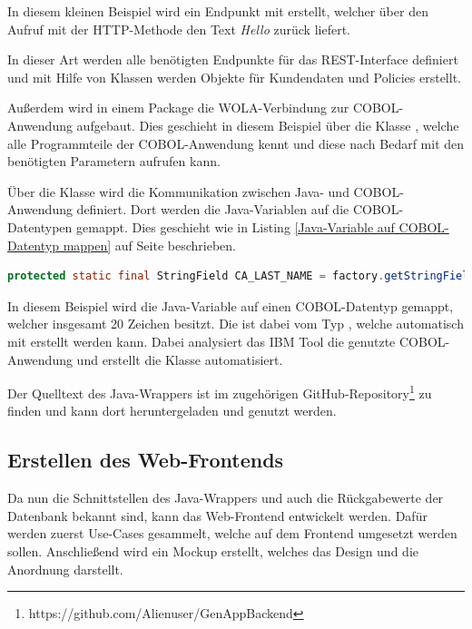In diesem kleinen Beispiel wird ein Endpunkt mit  erstellt, welcher über den Aufruf mit der HTTP-Methode
 den Text \textit{Hello} zurück liefert.

In dieser Art werden alle benötigten Endpunkte für das REST-Interface definiert und mit Hilfe von Klassen werden
Objekte für Kundendaten und Policies erstellt.

Außerdem wird in einem Package die WOLA-Verbindung zur COBOL-Anwendung aufgebaut. Dies geschieht in diesem Beispiel über
die Klasse , welche alle Programmteile der COBOL-Anwendung kennt und diese nach Bedarf mit den
benötigten Parametern aufrufen kann.

Über die Klasse  wird die Kommunikation zwischen Java- und COBOL-Anwendung definiert. Dort werden
die Java-Variablen auf die COBOL-Datentypen gemappt. Dies geschieht wie in Listing \ref{Java-Variable auf COBOL-Datentyp mappen}
auf Seite \pageref{Java-Variable auf COBOL-Datentyp mappen} beschrieben.

\begin{lstlisting}[language=java, caption=Java-Variable auf COBOL-Datentyp mappen, label=Java-Variable auf COBOL-Datentyp mappen]
    protected static final StringField CA_LAST_NAME = factory.getStringField(20);
\end{lstlisting}

In diesem Beispiel wird die Java-Variable  auf einen COBOL-Datentyp gemappt, welcher insgesamt 20 Zeichen
besitzt. Die  ist dabei vom Typ , welche automatisch mit
 erstellt werden kann. Dabei analysiert das IBM Tool die genutzte COBOL-Anwendung
und erstellt die Klasse automatisiert.

Der Quelltext des Java-Wrappers ist im zugehörigen GitHub-Repository\footnote{https://github.com/Alienuser/GenAppBackend}
zu finden und kann dort heruntergeladen und genutzt werden.

\subsection{Erstellen des Web-Frontends}
Da nun die Schnittstellen des Java-Wrappers und auch die Rückgabewerte der Datenbank bekannt sind, kann das Web-Frontend
entwickelt werden. Dafür werden zuerst Use-Cases gesammelt, welche auf dem Frontend umgesetzt werden sollen. Anschließend
wird ein Mockup erstellt, welches das Design und die Anordnung darstellt.

